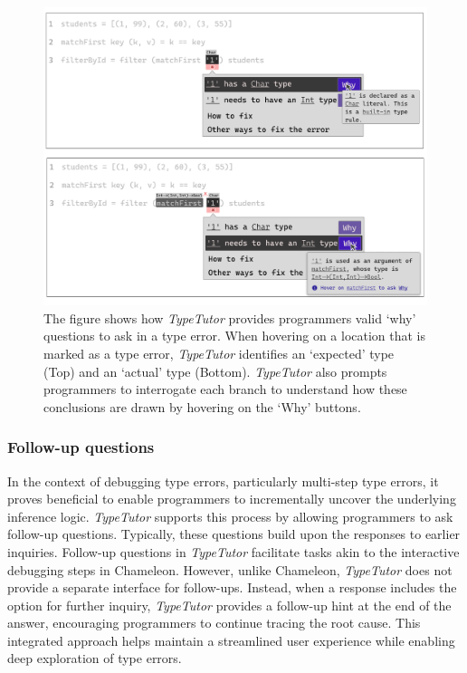 \begin{figure}[hbt]
  \includegraphics[width=\linewidth]{Why}
  \caption{
      \label{fig:why}
      The figure shows how \textit{TypeTutor} provides programmers valid `why' questions to ask in a type error. When hovering on a location that is marked as a type error, \textit{TypeTutor} identifies an `expected' type (Top) and an `actual' type (Bottom). \textit{TypeTutor} also prompts programmers to interrogate each branch to understand how these conclusions are drawn by hovering on the `Why' buttons. 
    }
\end{figure}



\subsubsection{Follow-up questions}

In the context of debugging type errors, particularly multi-step type errors, it proves beneficial to enable programmers to incrementally uncover the underlying inference logic. \textit{TypeTutor} supports this process by allowing programmers to ask follow-up questions. Typically, these questions build upon the responses to earlier inquiries. Follow-up questions in \textit{TypeTutor} facilitate tasks akin to the interactive debugging steps in Chameleon. However, unlike Chameleon, \textit{TypeTutor} does not provide a separate interface for follow-ups. Instead, when a response includes the option for further inquiry, \textit{TypeTutor} provides a follow-up hint at the end of the answer, encouraging programmers to continue tracing the root cause. This integrated approach helps maintain a streamlined user experience while enabling deep exploration of type errors.


